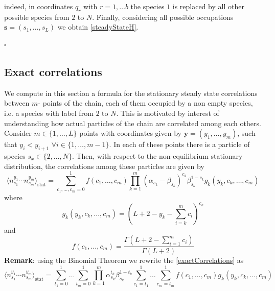 \documentclass[11pt]{article}
\numberwithin{equation}{section}
\numberwithin{equation}{subsection}
\begin{document}
indeed, in coordinates $q_{r}$ with $r=1,\ldots b$ the species $1$ is replaced by all other possible species from $2$ to $N$.  Finally, considering all possible occupations $\bm{s}=(s_{1},\ldots,s_{L})$ we obtain \eqref{steadyStateH}. 
\begin{flushright}
    $\square$
\end{flushright}
\subsection{Exact correlations}\label{correlation-section}
We compute in this section a formula for the stationary steady state correlations between $m$- points of the chain, each of them occupied by a non empty species, i.e. a species with label from $2$ to $N$. This is motivated by interest of understanding how actual particles of the chain are correlated among each others. Consider $m\in \{1,\ldots,L\}$ points with coordinates given by $\bm{y}=(y_{1},\ldots,y_{m})$, such that $y_{i}<y_{i+1}$ $\forall i\in \{1,\ldots,m-1\}$. In each of these points there is a particle of species $s_{x}\in \{2,\ldots,N\}$. Then, with respect to the non-equilibrium stationary distribution, the correlations among these particles are given by
\begin{equation}\label{exactCorrelations}
		\langle n^{y_{1}}_{s_{1}}\cdots n^{y_{m}}_{s_{m}}\rangle_{\text{stat}}=\sum_{c_{1},\ldots,c_{m}=0}^{1}
			f(c_{1},\ldots,c_{m})\prod_{k=1}^{m}(\alpha_{s_{k}}-\beta_{s_{k}})^{c_{k}}\beta_{s_{k}}^{1-c_{k}}g_{k}(y_{k},c_{k},\ldots,c_{m})
	\end{equation}
	where 
	\begin{equation}\label{powerCoeffSpecies}
		g_{k}(y_{k},c_{k},\ldots,c_{m})=\left(L+2-y_{k}-\sum_{i=k}^{m}c_{i}\right)^{c_{k}}
	\end{equation}
	and 
	\begin{equation}\label{powerCoeffNOspec}
		f(c_{1},\ldots,c_{m})=\frac{\Gamma(L+2-\sum_{i=1}^{m}c_{i})}{\Gamma(L+2)}
	\end{equation}
\textbf{Remark}: using the Binomial Theorem we rewrite the \eqref{exactCorrelations} as {\color{red}{add (-1)}}
\begin{equation}
	\langle n^{y_{1}}_{s_{1}}\cdots n^{y_{m}}_{s_{m}}\rangle_{\text{stat}}=\sum_{t_{1}=0}^{1}\ldots \sum_{t_{m}=0}^{1}\prod_{k=1}^{m}\alpha_{s_{k}}^{t_{k}}\beta_{s_{k}}^{1-t_{k}}\sum_{c_{1}=t_{1}}^{1}\ldots\sum_{c_{m}=t_{m}}^{1}f(c_{1},\ldots,c_{m})g_{k}(y_{k},c_{k},\ldots,c_{m})
\end{equation}
\end{document}
